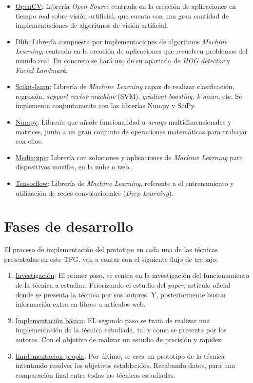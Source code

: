 \begin{itemize}
	\item \underline{OpenCV}: Librería \textit{Open Source} centrada en la creación de aplicaciones en tiempo real sobre visión artificial, que cuenta con una gran cantidad de implementaciones de algoritmos de visión artificial.
	\item \underline{Dlib}: Librería compuesta por implementaciones de algoritmos \textit{Machine Learning}, centrada en la creación de aplicaciones que resuelven problemas del mundo real. En concreto se hará uso de su apartado de \textit{HOG detector} y \textit{Facial Landmark}.
	\item \underline{Scikit-learn}: Librería de \textit{Machine Learning} capaz de realizar clasificación, regresión, \textit{support vector machine} (SVM), \textit{gradient boosting, \textit{k-mean}}, etc. Se implementa conjuntamente con las librerías Numpy y SciPy.
	\item \underline{Numpy}: Librería que añade funcionalidad a \textit{arrays} multidimensionales y matrices, junto a un gran conjunto de operaciones matemáticas para trabajar con ellos.
	\item \underline{Mediapipe}: Librería con soluciones y aplicaciones de \textit{Machine Learning} para dispositivos moviles, en la nube o web.
	\item \underline{Tensorflow}: Librería de \textit{Machine Learning}, referente a el entrenamiento y utilización de redes convolucionales (\textit{Deep Learning}).
\end{itemize}

\vspace{-0.5cm}
\section*{Fases de desarrollo}

El proceso de implementación del prototipo en cada una de las técnicas presentadas en este TFG, van a contar con el siguiente flujo de trabajo:

\begin{enumerate}
	\item \underline{Investigación}: El primer paso, se centra en la investigación del funcionamiento de la técnica a estudiar. Priorizando el estudio del \textit{paper}, artículo oficial donde se presenta la técnica por sus autores. Y, posteriormente buscar información extra en libros u artículos web.
	\item \underline{Implementación básica}: EL segundo paso se trata de realizar una implementación de la técnica estudiada, tal y como se presenta por los autores. Con el objetivo de realizar un estudio de precisión y rapidez.
	\item \underline{Implementacion propia}: Por último, se crea un prototipo de la técnica intentando resolver los objetivos establecidos. Recabando datos, para una comparación final entre todas las técnicas estudiadas.
\end{enumerate}

